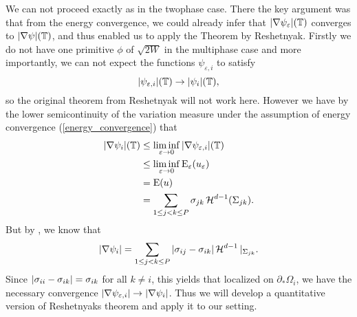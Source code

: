 \begin{remark}
	\label{difference_twophase_multiphase_curvature}
	We can not proceed exactly as in the twophase case. There the key argument 
	was that from the energy convergence, we could already infer that 
	$ \abs{ \nabla \psi_{ \varepsilon } } ( \operatorname{\mathbb{T}} ) $ converges to $ \abs{ 
	\nabla \psi } ( \operatorname{\mathbb{T}} ) $, and thus enabled us to apply the Theorem by 
	Reshetnyak. Firstly we do not have one 
	primitive $ \phi $ of $ \sqrt{ 2 W } $ in the multiphase case and more 
	importantly, we can 
	not expect the functions $ 
	\psi_{ \varepsilon ,  i } $ to satisfy 
	\begin{equation}
		\label{energy_convergence_of_psi_i}
		\abs{ \psi_{ \varepsilon ,i } } ( \operatorname{\mathbb{T}} ) \to \abs{ \psi_{ i } } ( 
		\operatorname{\mathbb{T}} ),
	\end{equation}
	so the original theorem from Reshetnyak will not work here. However we have 
	by the lower semicontinuity of the variation measure under the assumption 
	of energy convergence (\ref{energy_convergence}) that
	\begin{align*}
		\abs{ \nabla \psi_{ i } } ( \operatorname{\mathbb{T}} )
		&
		\leq
		\liminf_{ \varepsilon \to 0 }
		\abs{ \nabla \psi_{ \varepsilon , i } } ( \operatorname{\mathbb{T}} )
		\\
		& \leq
		\liminf_{ \varepsilon \to 0 }
		\operatorname{E}_{ \varepsilon } ( u_{ \varepsilon } )
		\\
		& =
		\operatorname{E} ( u )
		\\
		& =
		\sum_{ 1 \leq j < k \leq P }
		\sigma_{ j k }
		\operatorname{\mathcal{H}}^{ d -1 } ( \Sigma_{ j k } ).
	\end{align*}
	But by , we know that
	\begin{equation*}
		\abs{ \nabla \psi_{ i } }
		=
		\sum_{ 1 \leq j < k \leq P }
		\abs{ \sigma_{ i j } - \sigma_{ i k } }
		\operatorname{\mathcal{H}}^{ d - 1 } |_{ \Sigma_{ j k } }.
	\end{equation*}
	Since $ \abs{ \sigma_{ i i } - \sigma_{ i k } } = \sigma_{ i k } $ for all 
	$ k \neq i $,
	this yields that localized on $ \partial_{ \ast } \Omega_{ i } $, we have 
	the necessary convergence $ \abs{ \nabla \psi_{ \varepsilon ,i } } \to 
	\abs{ \nabla \psi_{ i } } $. Thus we will develop a quantitative version of 
	Reshetnyaks theorem and apply it to our setting.
\end{remark}

